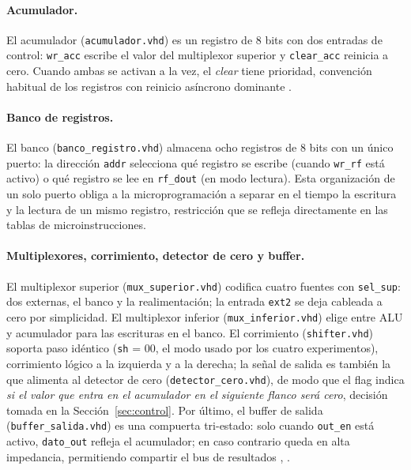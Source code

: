 \documentclass[llncs]{llncs}
\begin{document}
\paragraph{Acumulador.}
El acumulador (\texttt{acumulador.vhd}) es un registro de 8 bits con dos
entradas de control: \texttt{wr\_acc} escribe el valor del multiplexor
superior y \texttt{clear\_acc} reinicia a cero. Cuando ambas se activan
a la vez, el \emph{clear} tiene prioridad, convención habitual de los
registros con reinicio asíncrono dominante \cite{harris2015ddca}.

\paragraph{Banco de registros.}
El banco (\texttt{banco\_registro.vhd}) almacena ocho registros de 8
bits con un único puerto: la dirección \texttt{addr} selecciona qué
registro se escribe (cuando \texttt{wr\_rf} está activo) o qué registro
se lee en \texttt{rf\_dout} (en modo lectura). Esta organización de un
solo puerto obliga a la microprogramación a separar en el tiempo la
escritura y la lectura de un mismo registro, restricción que se refleja
directamente en las tablas de microinstrucciones.

\paragraph{Multiplexores, corrimiento, detector de cero y buffer.}
El multiplexor superior (\texttt{mux\_superior.vhd}) codifica cuatro
fuentes con \texttt{sel\_sup}: dos externas, el banco y la
realimentación; la entrada \texttt{ext2} se deja cableada a cero por
simplicidad. El multiplexor inferior (\texttt{mux\_inferior.vhd}) elige
entre ALU y acumulador para las escrituras en el banco. El corrimiento
(\texttt{shifter.vhd}) soporta paso idéntico (\texttt{sh} = 00, el modo
usado por los cuatro experimentos), corrimiento lógico a la izquierda y
a la derecha; la señal de salida es también la que alimenta al detector
de cero (\texttt{detector\_cero.vhd}), de modo que el flag indica
\emph{si el valor que entra en el acumulador en el siguiente flanco será
cero}, decisión tomada en la Sección~\ref{sec:control}. Por último, el
buffer de salida (\texttt{buffer\_salida.vhd}) es una compuerta
tri-estado: solo cuando \texttt{out\_en} está activo, \texttt{dato\_out}
refleja el acumulador; en caso contrario queda en alta impedancia,
permitiendo compartir el bus de resultados \cite{wakerly2005ddpp},
\cite{wiki-tristate}.
\end{document}
